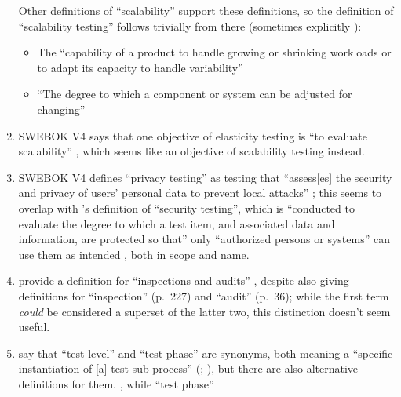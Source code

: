 \begin{enumerate}
\begin{enumerate}
                        \citep[p.~5-5]{SWEBOK2024}
            \end{enumerate}
            Other definitions of ``scalability'' support these definitions, so
            the definition of ``scalability testing'' follows trivially from there
            (sometimes explicitly \citepISTQB{}):
            \begin{itemize}
                  \item The ``capability of a product to handle growing or
                        shrinking workloads or to adapt its capacity to handle
                        variability'' \citep{ISO_IEC2023a}
                  \item ``The degree to which a component or system can be
                        adjusted for changing'' \citepISTQB{}
            \end{itemize}
      \item SWEBOK V4 says that one objective of elasticity testing is ``to
            evaluate scalability'' \citep[p.~5-9]{SWEBOK2024}, which seems like
            an objective of scalability testing instead.
      \item SWEBOK V4 defines ``privacy testing'' as testing that ``assess[es]
            the security and privacy of users' personal data to prevent local
            attacks'' \citep[p.~5-10]{SWEBOK2024}; this seems to overlap with
            \citeauthor{IEEE2022}'s definition of ``security testing'', which is
            ``conducted to evaluate the degree to which a test item, and
            associated data and information, are protected so that'' only
            ``authorized persons or systems'' can use them as intended
            \citeyearpar[p.~9]{IEEE2022}, both in scope and name.
      \item \citeauthor*{IEEE2017} provide a definition for ``inspections and
            audits'' \citeyearpar[p.~228]{IEEE2017}, despite also giving
            definitions for ``inspection'' (p.~227) and ``audit'' (p.~36);
            while the first term \emph{could} be considered a superset of the
            latter two, this distinction doesn't seem useful.
      \item \citeauthor*{IEEE2017} say that ``test level'' and ``test phase''
            are synonyms, both meaning a ``specific instantiation of [a] test
            sub-process'' (\citeyear[pp.~469,~470]{IEEE2017};
            \citeyear[p.~9]{IEEE2013}), but there are also alternative
            definitions for them. \procLevel{\citeyearpar}, while
            ``test phase'' \phaseDef{}

\end{enumerate}
